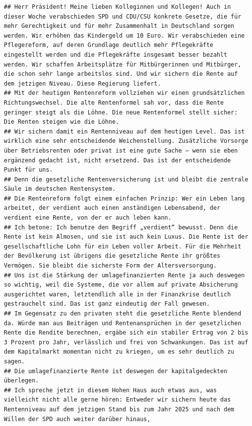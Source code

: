 \documentclass[oneside, 12pt, numbers=endperiod]{scrbook}
\theoremstyle{definition}
\theoremstyle{definition}
\theoremstyle{definition}
\theoremstyle{remark}
\begin{document}
\begin{verbatim}
## Herr Präsident! Meine lieben Kolleginnen und Kollegen! Auch in dieser Woche verabschieden SPD und CDU/CSU konkrete Gesetze, die für mehr Gerechtigkeit und für mehr Zusammenhalt in Deutschland sorgen werden. Wir erhöhen das Kindergeld um 10 Euro. Wir verabschieden eine Pflegereform, auf deren Grundlage deutlich mehr Pflegekräfte eingestellt werden und die Pflegekräfte insgesamt besser bezahlt werden. Wir schaffen Arbeitsplätze für Mitbürgerinnen und Mitbürger, die schon sehr lange arbeitslos sind. Und wir sichern die Rente auf dem jetzigen Niveau. Diese Regierung liefert. 
## Mit der heutigen Rentenreform vollziehen wir einen grundsätzlichen Richtungswechsel. Die alte Rentenformel sah vor, dass die Rente geringer steigt als die Löhne. Die neue Rentenformel stellt sicher: Die Renten steigen wie die Löhne. 
## Wir sichern damit ein Rentenniveau auf dem heutigen Level. Das ist wirklich eine sehr entscheidende Weichenstellung. Zusätzliche Vorsorge über Betriebsrenten oder privat ist eine gute Sache – wenn sie eben ergänzend gedacht ist, nicht ersetzend. Das ist der entscheidende Punkt für uns. 
## Denn die gesetzliche Rentenversicherung ist und bleibt die zentrale Säule im deutschen Rentensystem. 
## Die Rentenreform folgt einem einfachen Prinzip: Wer ein Leben lang arbeitet, der verdient auch einen anständigen Lebensabend, der verdient eine Rente, von der er auch leben kann. 
## Ich betone: Ich benutze den Begriff „verdient“ bewusst. Denn die Rente ist kein Almosen, und sie ist auch kein Luxus. Die Rente ist der gesellschaftliche Lohn für ein Leben voller Arbeit. Für die Mehrheit der Bevölkerung ist übrigens die gesetzliche Rente ihr größtes Vermögen. Sie bleibt die sicherste Form der Altersversorgung. 
## Uns ist die Stärkung der umlagefinanzierten Rente ja auch deswegen so wichtig, weil die Systeme, die vor allem auf private Absicherung ausgerichtet waren, letztendlich alle in der Finanzkrise deutlich gestrauchelt sind. Das ist ganz eindeutig der Fall gewesen. 
## Im Gegensatz zu den privaten steht die gesetzliche Rente blendend da. Würde man aus Beiträgen und Rentenansprüchen in der gesetzlichen Rente die Rendite berechnen, ergäbe sich ein stabiler Ertrag von 2 bis 3 Prozent pro Jahr, verlässlich und frei von Schwankungen. Das ist auf dem Kapitalmarkt momentan nicht zu kriegen, um es sehr deutlich zu sagen. 
## Die umlagefinanzierte Rente ist deswegen der kapitalgedeckten überlegen. 
## Ich spreche jetzt in diesem Hohen Haus auch etwas aus, was vielleicht nicht alle gerne hören: Entweder wir sichern heute das Rentenniveau auf dem jetzigen Stand bis zum Jahr 2025 und nach dem Willen der SPD auch weiter darüber hinaus, 

\end{verbatim}
\end{document}
